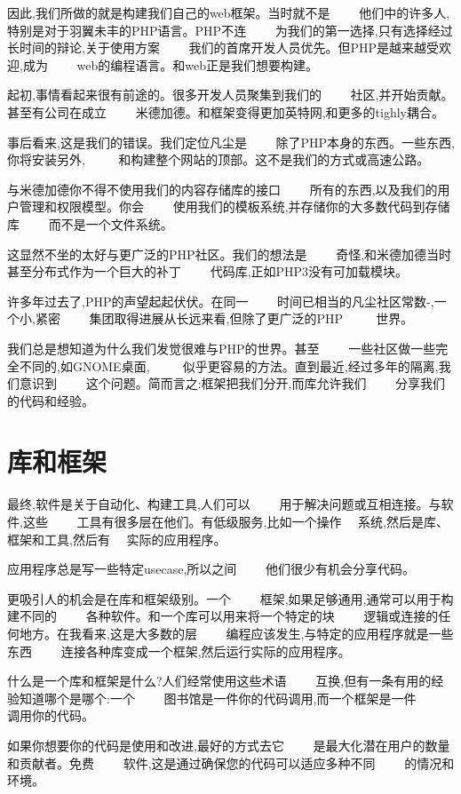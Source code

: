 因此,我们所做的就是构建我们自己的web框架。当时就不是　　
他们中的许多人,特别是对于羽翼未丰的PHP语言。PHP不连　　
为我们的第一选择,只有选择经过长时间的辩论,关于使用方案　　
我们的首席开发人员优先。但PHP是越来越受欢迎,成为　　
web的编程语言。和web正是我们想要构建。

起初,事情看起来很有前途的。很多开发人员聚集到我们的　　
社区,并开始贡献。甚至有公司在成立　　
米德加德。和框架变得更加英特网,和更多的tighly耦合。

事后看来,这是我们的错误。我们定位凡尘是　　
除了PHP本身的东西。一些东西,你将安装另外, 　　
和构建整个网站的顶部。这不是我们的方式或高速公路。


与米德加德你不得不使用我们的内容存储库的接口　　
所有的东西,以及我们的用户管理和权限模型。你会　　
使用我们的模板系统,并存储你的大多数代码到存储库　　
而不是一个文件系统。

这显然不坐的太好与更广泛的PHP社区。我们的想法是　　
奇怪,和米德加德当时甚至分布式作为一个巨大的补丁　　
代码库,正如PHP3没有可加载模块。

许多年过去了,PHP的声望起起伏伏。在同一　　
时间已相当的凡尘社区常数-,一个小,紧密　　
集团取得进展从长远来看,但除了更广泛的PHP 　　
世界。

我们总是想知道为什么我们发觉很难与PHP的世界。甚至　　
一些社区做一些完全不同的,如GNOME桌面, 　　
似乎更容易的方法。直到最近,经过多年的隔离,我们意识到　　
这个问题。简而言之:框架把我们分开,而库允许我们　　
分享我们的代码和经验。

\section*{库和框架}

最终,软件是关于自动化、构建工具,人们可以　　
用于解决问题或互相连接。与软件,这些　　
工具有很多层在他们。有低级服务,比如一个操作　
系统,然后是库、框架和工具,然后有　
实际的应用程序。

应用程序总是写一些特定usecase,所以之间　　
他们很少有机会分享代码。

更吸引人的机会是在库和框架级别。一个　　
框架,如果足够通用,通常可以用于构建不同的　　
各种软件。和一个库可以用来将一个特定的块　　
逻辑或连接的任何地方。在我看来,这是大多数的层　　
编程应该发生,与特定的应用程序就是一些东西　　
连接各种库变成一个框架,然后运行实际的应用程序。

什么是一个库和框架是什么?人们经常使用这些术语　　
互换,但有一条有用的经验知道哪个是哪个:一个　　
图书馆是一件你的代码调用,而一个框架是一件　　
调用你的代码。

如果你想要你的代码是使用和改进,最好的方式去它　　
是最大化潜在用户的数量和贡献者。免费　　
软件,这是通过确保您的代码可以适应多种不同　　
的情况和环境。

